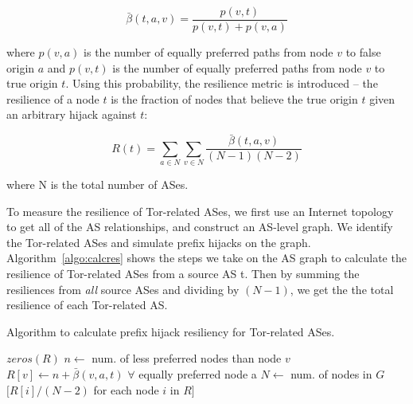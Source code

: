 \begin{equation}
\bar{\beta}(t,a,v) = \frac {p(v,t)} {p(v,t) + p(v,a)}
\end{equation}

where $p(v,a)$ is the number of equally preferred paths from node $v$ to false origin $a$ and $p(v,t)$ is the number of equally preferred paths from node $v$ to true origin $t$.  Using this probability, the resilience metric is introduced -- the resilience of a node $t$ is the fraction of nodes that believe the true origin $t$ given an arbitrary hijack against $t$:

\begin{equation}
R(t) = \sum_{a \in N} \sum_{v \in N} \frac {\bar{\beta}(t,a,v)} {(N-1)(N-2)}
\end{equation}

where N is the total number of ASes.

To measure the resilience of Tor-related ASes, we first use an Internet topology~\cite{caida} to get all of the AS relationships, and construct an AS-level graph.  We identify the Tor-related ASes and simulate prefix hijacks on the graph. Algorithm~\ref{algo:calcres} shows the steps we take on the AS graph to calculate the resilience of Tor-related ASes from a source AS t. Then by summing the resiliences from \emph{all} source ASes and dividing by $(N-1)$, we get the the total resilience of each Tor-related AS.



\begin{algorithm}
\caption{Algorithm to calculate prefix hijack resiliency for Tor-related ASes.}
\label{algo:calcres}
\begin{algorithmic}
    \State {}
    \State $zeros(R)$
		\State $n \gets $ num. of less preferred nodes than node $v$
		\State $R[v] \gets n + \bar{\beta}(v,a,t)$ $\forall$ equally preferred node a
	\EndIf
    \EndFor
    \State $N \gets$ num. of nodes in $G$
    \State \Return $[R[i] / (N-2)$ for each node $i$ in $R]$
\EndFunction
\end{algorithmic}
\end{algorithm}

